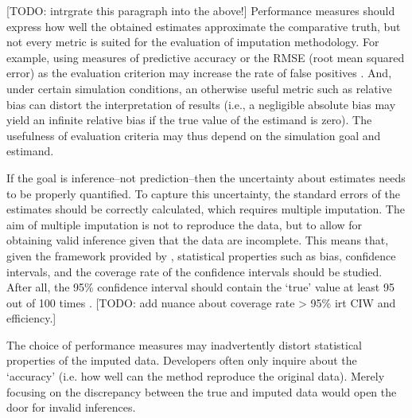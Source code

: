\documentclass[bimj,fleqn]{w-art}
\begin{document}
[TODO: intrgrate this paragraph into the above!] Performance measures should express how well the obtained estimates approximate the comparative truth, but not every metric is suited for the evaluation of imputation methodology. For example, using measures of predictive accuracy or the RMSE (root mean squared error) as the evaluation criterion may increase the rate of false positives \citep[][\S 2.6]{buur18}. And, under certain simulation conditions, an otherwise useful metric such as relative bias can distort the interpretation of results (i.e., a negligible absolute bias may yield an infinite relative bias if the true value of the estimand is zero). The usefulness of evaluation criteria may thus depend on the simulation goal and estimand.

If the goal is inference--not prediction--then the uncertainty about estimates needs to be properly quantified. To capture this uncertainty, the standard errors of the estimates should be correctly calculated, which requires multiple imputation. The aim of multiple imputation is not to reproduce the data, but to allow for obtaining valid inference given that the data are incomplete. This means that, given the framework provided by \citet{rubi87}, statistical properties such as bias, confidence intervals, and the coverage rate of the confidence intervals should be studied. After all, the 95\% confidence interval should contain the `true' value at least 95 out of 100 times \citep[][p. 591]{neym34}. [TODO: add nuance about coverage rate > 95\% irt CIW and efficiency.]

The choice of performance measures may inadvertently distort statistical properties of the imputed data. Developers often only inquire about the `accuracy' (i.e. how well can the method reproduce the original data). Merely focusing on the discrepancy between the true and imputed data would open the door for invalid inferences. 
\end{document}
